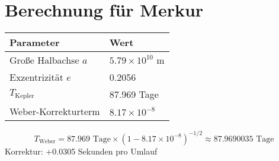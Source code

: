 \section{Berechnung für Merkur}
\begin{table}[h]
\centering
\begin{tabular}{|l|l|}
\hline
\textbf{Parameter} & \textbf{Wert} \\ \hline
Große Halbachse $a$ & $5.79 \times 10^{10}$ m \\ \hline
Exzentrizität $e$ & 0.2056 \\ \hline
$T_{\text{Kepler}}$ & 87.969 Tage \\ \hline
Weber-Korrekturterm & $8.17 \times 10^{-8}$ \\ \hline
\end{tabular}
\end{table}

\[
T_{\text{Weber}} = 87.969 \text{ Tage} \times \left(1 - 8.17 \times 10^{-8}\right)^{-1/2} \approx 87.9690035 \text{ Tage}
\]
Korrektur: +0.0305 Sekunden pro Umlauf